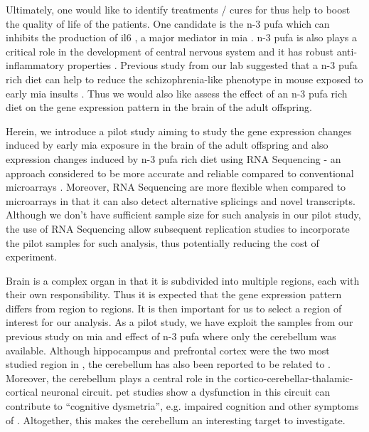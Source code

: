 Ultimately, one would like to identify treatments / cures for  thus help to boost the quality of life of the  patients.
One candidate is the n-3 \gls{pufa} which can inhibits the production of \gls{il6} \citep{Trebble2003}, a major mediator in \gls{mia} \citep{Smith2007}.
n-3 \gls{pufa} is also plays a critical role in the development of central nervous system \citep{Clandinin1999} and it has robust anti-inflammatory properties \citep{Trebble2003}.
Previous study from our lab suggested that a n-3 \gls{pufa} rich diet can help to reduce the schizophrenia-like phenotype in mouse exposed to early \gls{mia} insults \citep{Li2015}. 
Thus we would also like assess the effect of an n-3 \gls{pufa} rich diet on the gene expression pattern in the brain of the adult offspring.

Herein, we introduce a pilot study aiming to study the gene expression changes induced by early \gls{mia} exposure in the brain of the adult offspring and also expression changes induced by n-3 \gls{pufa} rich diet using RNA Sequencing - an approach considered to be more accurate and reliable compared to conventional microarrays \citep{Wang2009d}.
Moreover, RNA Sequencing are more flexible when compared to microarrays in that it can also detect alternative splicings and novel transcripts. 
Although we don't have sufficient sample size for such analysis in our pilot study, the use of RNA Sequencing allow subsequent replication studies to incorporate the pilot samples for such analysis, thus potentially reducing the cost of experiment.

Brain is a complex organ in that it is subdivided into multiple regions, each with their own responsibility.
Thus it is expected that the gene expression pattern differs from region to regions.
It is then important for us to select a region of interest for our analysis. 
As a pilot study, we have exploit the samples from our previous study on \gls{mia} and effect of n-3 \gls{pufa} \citep{Li2015} where only the cerebellum was available.
Although hippocampus \citep{Velakoulis2006,Nugent2007} and prefrontal cortex \citep{Knable1997,Perlstein2001} were the two most studied region in , the cerebellum has also been reported to be related to  \citep{Yeganeh-Doost2011,Andreasen2008}.
Moreover, the cerebellum plays a central role in the cortico-cerebellar-thalamic-cortical neuronal circuit.
\Gls{pet} studies show a dysfunction in this  circuit can contribute to ``cognitive dysmetria'', e.g. impaired cognition and other symptoms of  \citep{Yeganeh-Doost2011}.
Altogether, this makes the cerebellum an interesting target to investigate.

